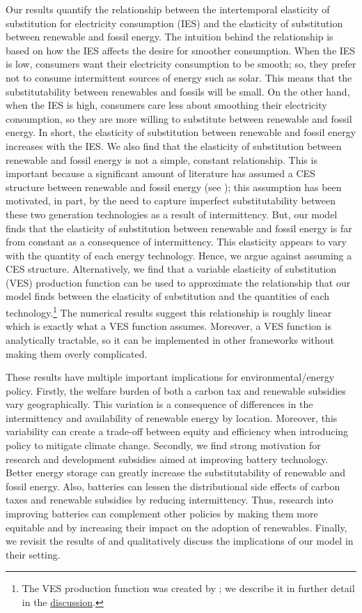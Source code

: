 \documentclass[11pt,a4paper,leqno]{extarticle}
\begin{document}
	
	Our results quantify the relationship between the intertemporal elasticity of substitution for electricity consumption  (IES) and the elasticity of substitution between renewable and fossil energy. The intuition behind the relationship is based on how the IES affects the desire for smoother consumption. When the IES is low, consumers want their electricity consumption to be smooth; so, they prefer not to consume intermittent sources of energy such as solar. This means that the substitutability between renewables and fossils will be small. On the other hand, when the IES is high, consumers care less about smoothing their electricity consumption, so they are more willing to substitute between renewable and fossil energy. In short, the elasticity of substitution between renewable and fossil energy increases with the IES. We also find that the elasticity of substitution between renewable and fossil energy is not a simple, constant relationship. This is important because a significant amount of literature has assumed a CES structure between renewable and fossil energy (see \citet{Pap}); this assumption has been motivated, in part, by the need to capture imperfect substitutability between these two generation technologies as a result of intermittency. But, our model finds that the elasticity of substitution between renewable and fossil energy is far from constant as a consequence of intermittency. This elasticity appears to vary with the quantity of each energy technology. Hence, we argue against assuming a CES structure. Alternatively, we find that a variable elasticity of substitution (VES) production function can be used to approximate the relationship that our model finds between the elasticity of substitution and the quantities of each technology.\footnote{ The VES production function was created by \citet{VES}; we describe it in further detail in the \hyperref[sec:VES]{discussion}. } The numerical results suggest this relationship is roughly linear which is exactly what a VES function assumes. Moreover, a VES function is analytically tractable, so it can be implemented in other frameworks without making them overly complicated. 
	
	These results have multiple important implications for environmental/energy policy. Firstly, the welfare burden of both a carbon tax and renewable subsidies vary geographically. This variation is a consequence of differences in the intermittency and availability of renewable energy by location. Moreover, this variability can create a trade-off between equity and efficiency when introducing policy to mitigate climate change. Secondly, we find strong motivation for research and development subsidies aimed at improving battery technology. Better energy storage can greatly increase the substitutability of renewable and fossil energy.  Also, batteries can  lessen the distributional side effects of carbon taxes and renewable subsidies by  reducing intermittency. Thus, research into improving batteries can complement other policies by making them more equitable and by increasing their impact on the adoption of renewables. Finally, we revisit the results of \citet{Ace2012} and qualitatively discuss the implications of our model in their setting.
	
\end{document}
